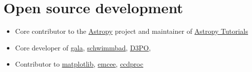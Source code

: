 \documentclass[12pt, letterpaper]{apw-cv}
\begin{document}
\begin{itemize}

\end{itemize}


\section*{Open source development \href{https://github.com/adrn}{\faGithub}}

\begin{itemize}

	\item Core contributor to the \href{http://www.astropy.org/}{Astropy} project and maintainer of \href{http://tutorials.astropy.org/}{Astropy Tutorials}
	\item Core developer of \href{http://gala.adrian.pw}{gala}, \href{https://github.com/adrn/schwimmbad}{schwimmbad}, \href{http://d3po.org}{D3PO},
	\item Contributor to \href{http://matplotlib.org/}{matplotlib}, \href{http://dan.iel.fm/emcee/current/}{emcee}, \href{https://github.com/astropy/ccdproc}{ccdproc}

\end{itemize}
\end{document}
